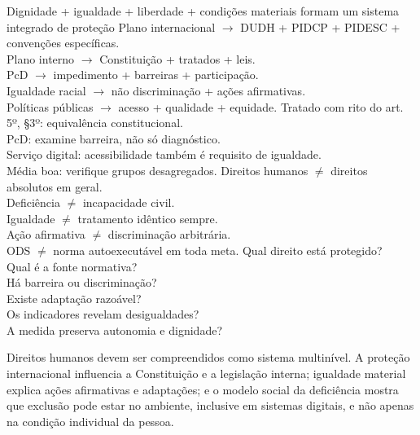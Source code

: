 {Dignidade + igualdade + liberdade + condições materiais formam um sistema integrado de proteção}
{Plano internacional $\rightarrow$ DUDH + PIDCP + PIDESC + convenções específicas.\\Plano interno $\rightarrow$ Constituição + tratados + leis.\\PcD $\rightarrow$ impedimento + barreiras + participação.\\Igualdade racial $\rightarrow$ não discriminação + ações afirmativas.\\Políticas públicas $\rightarrow$ acesso + qualidade + equidade.}
{Tratado com rito do art. 5º, §3º: equivalência constitucional.\\PcD: examine barreira, não só diagnóstico.\\Serviço digital: acessibilidade também é requisito de igualdade.\\Média boa: verifique grupos desagregados.}
{Direitos humanos $\neq$ direitos absolutos em geral.\\Deficiência $\neq$ incapacidade civil.\\Igualdade $\neq$ tratamento idêntico sempre.\\Ação afirmativa $\neq$ discriminação arbitrária.\\ODS $\neq$ norma autoexecutável em toda meta.}
{Qual direito está protegido?\\Qual é a fonte normativa?\\Há barreira ou discriminação?\\Existe adaptação razoável?\\Os indicadores revelam desigualdades?\\A medida preserva autonomia e dignidade?}

\begin{resumo}
Direitos humanos devem ser compreendidos como sistema multinível. A proteção internacional influencia a Constituição e a legislação interna; igualdade material explica ações afirmativas e adaptações; e o modelo social da deficiência mostra que exclusão pode estar no ambiente, inclusive em sistemas digitais, e não apenas na condição individual da pessoa.
\end{resumo}
